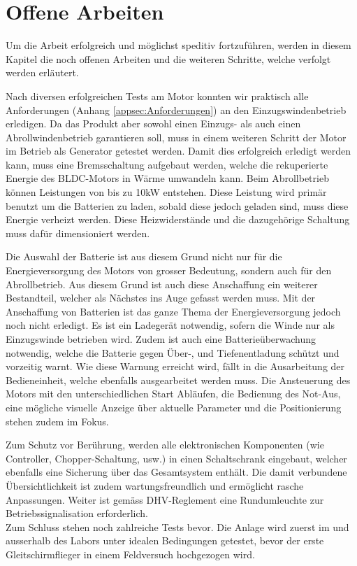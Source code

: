 \section{Offene Arbeiten}
Um die Arbeit erfolgreich und möglichst speditiv fortzuführen, werden in diesem Kapitel die noch offenen Arbeiten und die weiteren Schritte, welche verfolgt werden erläutert.

Nach diversen erfolgreichen Tests am Motor konnten wir praktisch alle Anforderungen (Anhang \ref{appsec:Anforderungen}) an den Einzugswindenbetrieb erledigen. Da das Produkt aber sowohl einen Einzugs- als auch einen Abrollwindenbetrieb garantieren soll, muss in einem weiteren Schritt der Motor im Betrieb als Generator getestet werden. Damit dies erfolgreich erledigt werden kann, muss eine Bremsschaltung aufgebaut werden, welche die rekuperierte Energie des BLDC-Motors in Wärme umwandeln kann. Beim Abrollbetrieb können Leistungen von bis zu 10kW entstehen. Diese Leistung wird primär benutzt um die Batterien zu laden, sobald diese jedoch geladen sind, muss diese Energie verheizt werden. Diese Heizwiderstände und die dazugehörige Schaltung muss dafür dimensioniert werden.

Die Auswahl der Batterie ist aus diesem Grund nicht nur für die Energieversorgung des Motors von grosser Bedeutung, sondern auch für den Abrollbetrieb. Aus diesem Grund ist auch diese Anschaffung ein weiterer Bestandteil, welcher als Nächstes ins Auge gefasst werden muss. Mit der Anschaffung von Batterien ist das ganze Thema der Energieversorgung jedoch noch nicht erledigt. Es ist ein Ladegerät notwendig, sofern die Winde nur als Einzugswinde betrieben wird. Zudem ist auch eine Batterieüberwachung notwendig, welche die Batterie gegen Über-, und Tiefenentladung schützt und vorzeitig warnt. Wie diese Warnung erreicht wird, fällt in die Ausarbeitung der Bedieneinheit, welche ebenfalls ausgearbeitet werden muss. Die Ansteuerung des Motors mit den unterschiedlichen Start Abläufen, die Bedienung des Not-Aus, eine mögliche visuelle Anzeige über aktuelle Parameter und die Positionierung stehen zudem im Fokus.

Zum Schutz vor Berührung, werden alle elektronischen Komponenten (wie Controller, Chopper-Schaltung, usw.) in einen Schaltschrank eingebaut, welcher ebenfalls eine Sicherung über das Gesamtsystem enthält. Die damit verbundene Übersichtlichkeit ist zudem wartungsfreundlich und ermöglicht rasche Anpassungen. Weiter ist gemäss DHV-Reglement eine Rundumleuchte zur Betriebssignalisation erforderlich.\\
Zum Schluss stehen noch zahlreiche Tests bevor. Die Anlage wird zuerst im und ausserhalb des Labors unter idealen Bedingungen getestet, bevor der erste Gleitschirmflieger in einem Feldversuch hochgezogen wird.